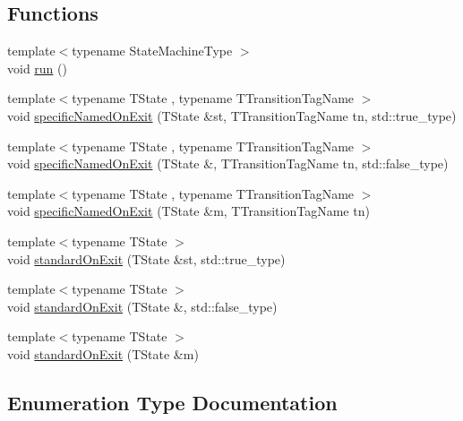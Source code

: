 \subsection*{Functions}
\begin{DoxyCompactItemize}
\item 
{\footnotesize template$<$typename State\+Machine\+Type $>$ }\\void \hyperlink{namespacesmacc_a47ac3b8d2968b1ba4152afd64ab66bd0}{run} ()
\item 
{\footnotesize template$<$typename T\+State , typename T\+Transition\+Tag\+Name $>$ }\\void \hyperlink{namespacesmacc_afd94fcb8f8c410a0ced7954bf76e845d}{specific\+Named\+On\+Exit} (T\+State \&st, T\+Transition\+Tag\+Name tn, std\+::true\+\_\+type)
\item 
{\footnotesize template$<$typename T\+State , typename T\+Transition\+Tag\+Name $>$ }\\void \hyperlink{namespacesmacc_ab1896cb023506b0a47d26d32cc078eb4}{specific\+Named\+On\+Exit} (T\+State \&, T\+Transition\+Tag\+Name tn, std\+::false\+\_\+type)
\item 
{\footnotesize template$<$typename T\+State , typename T\+Transition\+Tag\+Name $>$ }\\void \hyperlink{namespacesmacc_ad462e5c9a025fe42bb06de617fabeaa5}{specific\+Named\+On\+Exit} (T\+State \&m, T\+Transition\+Tag\+Name tn)
\item 
{\footnotesize template$<$typename T\+State $>$ }\\void \hyperlink{namespacesmacc_ab3aebd999834404be47a62ea03aacfc9}{standard\+On\+Exit} (T\+State \&st, std\+::true\+\_\+type)
\item 
{\footnotesize template$<$typename T\+State $>$ }\\void \hyperlink{namespacesmacc_a17d9a98b5ae8bbeea7dc632105731e25}{standard\+On\+Exit} (T\+State \&, std\+::false\+\_\+type)
\item 
{\footnotesize template$<$typename T\+State $>$ }\\void \hyperlink{namespacesmacc_a1869b4edce2e6cf5023776b3ddaddf21}{standard\+On\+Exit} (T\+State \&m)
\end{DoxyCompactItemize}


\subsection{Enumeration Type Documentation}
\mbox{\label{namespacesmacc_a5063f47926ad2fe25120ed4b1e7b2c7e}} 
